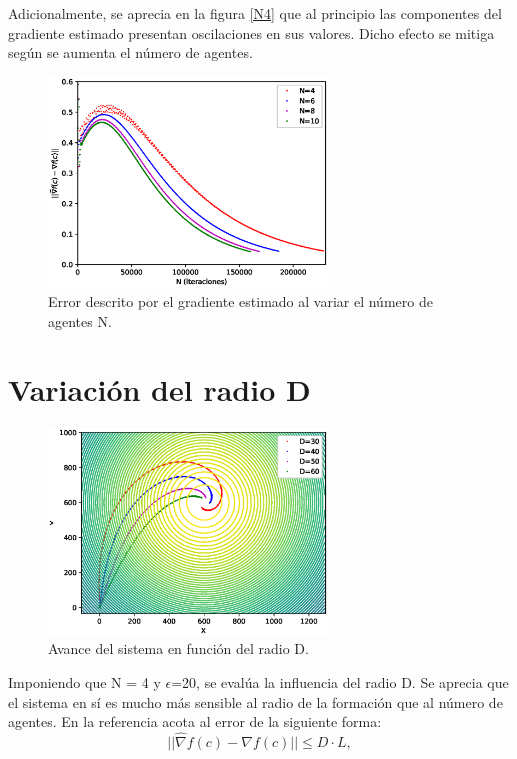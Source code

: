 Adicionalmente, se aprecia en la figura \ref{N4} que al principio las componentes del gradiente estimado presentan oscilaciones en sus valores. Dicho efecto se mitiga según se aumenta el número de agentes.

\begin{figure}[H]
\centering
\includegraphics[width=0.66\textwidth]{figures/Graficas_Nuevas/N/Figure_5.eps}
\caption{Error descrito por el gradiente estimado al variar el número de agentes N.} \label{N_Var_Error}
\end{figure}

\section{Variación del radio D}

\begin{figure}[H]
\centering
\includegraphics[width=0.66\textwidth]{figures/Dif_R_BU/Figure_1.eps}
\caption{Avance del sistema en función del radio D.} \label{D_Var}
\end{figure}

Imponiendo que N = 4 y $\epsilon$=20, se evalúa la influencia del radio D. Se aprecia que el sistema en sí es mucho más sensible al radio de la formación que al número de agentes. En la referencia \cite{Adicional_Estimacion_1} acota al error de la siguiente forma:
\begin{equation}\label{Depe}
	||\hat{\nabla}f\left(c\right)-\nabla{f}\left(c\right)||\leqslant{D·L},
\end{equation}

